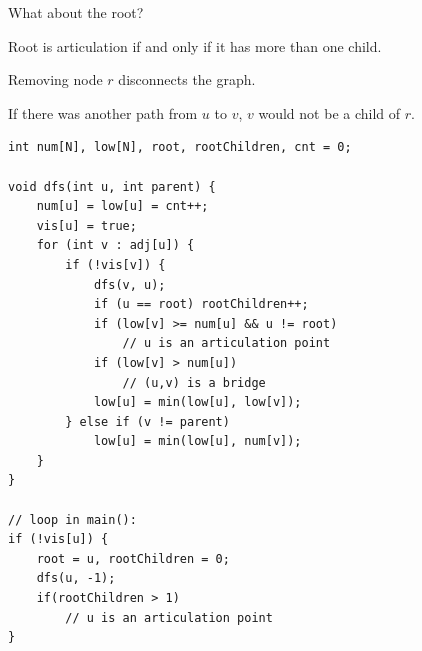 \documentclass[10pt]{beamer}
\begin{document}
\begin{frame}

What about the root? \pause 

\vspace{0.5cm}

Root is articulation if and only if it has more than one child.

\vspace{0.5cm}

\begin{center}
\end{center}

\vspace{0.5cm}

Removing node $r$ disconnects the graph.

\vspace{0.5cm}

If there was another path from $u$ to $v$, $v$ would not be a child of $r$.

\end{frame}


\begin{frame}[fragile]

\begin{lstlisting}
int num[N], low[N], root, rootChildren, cnt = 0;

void dfs(int u, int parent) {
    num[u] = low[u] = cnt++;
    vis[u] = true;
    for (int v : adj[u]) {
        if (!vis[v]) {
            dfs(v, u);
            if (u == root) rootChildren++;
            if (low[v] >= num[u] && u != root)
                // u is an articulation point
            if (low[v] > num[u])
                // (u,v) is a bridge
            low[u] = min(low[u], low[v]);
        } else if (v != parent)
            low[u] = min(low[u], num[v]);
    }
}

// loop in main():
if (!vis[u]) {
    root = u, rootChildren = 0;
    dfs(u, -1);
    if(rootChildren > 1)
        // u is an articulation point
}
\end{lstlisting}

\end{frame}
\end{document}
